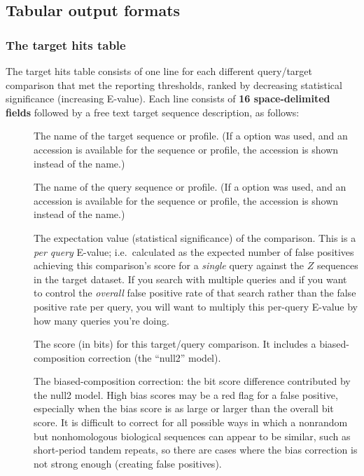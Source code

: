 \begin{description}



\subsection{Tabular output formats}

\subsubsection{The target hits table}

The target hits table consists of one line for each different
query/target comparison that met the reporting thresholds, ranked by
decreasing statistical significance (increasing E-value).  Each line
consists of \textbf{16 space-delimited fields} followed by a free text
target sequence description, as follows:

\begin{description}
\item[]
  The name of the target sequence or
  profile.  (If a  option was used, and an accession is
  available for the sequence or profile, the accession is shown
  instead of the name.) 

\item[] 
  The name of the query sequence or profile.
  (If a  option was used, and an accession is
  available for the sequence or profile, the accession is shown
  instead of the name.) 

\item[] The expectation value
  (statistical significance) of the comparison.  This is a \emph{per
  query} E-value; i.e.\ calculated as the expected number of false
  positives achieving this comparison's score for a \emph{single}
  query against the $Z$ sequences in the target dataset.  If you
  search with multiple queries and if you want to control the
  \emph{overall} false positive rate of that search rather than the
  false positive rate per query, you will want to multiply this
  per-query E-value by how many queries you're doing.

\item[] 
  The score (in bits) for this target/query comparison. It includes
  a biased-composition correction (the ``null2'' model). 

\item[] The biased-composition
  correction: the bit score difference contributed by the null2
  model. High bias scores may be a red flag for a false positive,
  especially when the bias score is as large or larger than the
  overall bit score. It is difficult to correct for all possible ways
  in which a nonrandom but nonhomologous biological sequences can
  appear to be similar, such as short-period tandem repeats, so there
  are cases where the bias correction is not strong enough (creating
  false positives).


\end{description}
\end{description}
